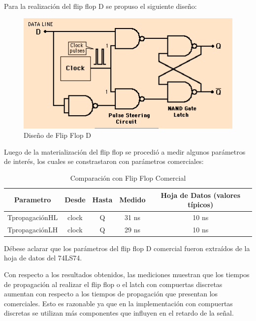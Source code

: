 Para la realización del flip flop D se propuso el siguiente diseño:

\begin{figure}[H]
\centering
\includegraphics[scale=0.5]{./circuitoFLIPFLOP.PNG}
\caption{Diseño de Flip Flop D}
\end{figure}

Luego de la materialización del flip flop se procedió a medir algunos
parámetros de interés, los cuales se constrastaron con parámetros
comerciales:

\begin{table}[H]
    \centering
\begin{tabular}{|c|c|c|c|c|}
\hline 
Parametro & Desde & Hasta & Medido & Hoja de Datos (valores típicos)\tabularnewline
\hline 
\hline 
TpropagaciónHL & clock & Q & 31 ns & 10 ns\tabularnewline
\hline 
TpropagaciónLH & clock & Q & 29 ns & 10 ns\tabularnewline
\hline 
\end{tabular}

\caption{Comparación con Flip Flop Comercial}
\end{table}

Débese aclarar que los parámetros del flip flop D comercial fueron
extraídos de la hoja de datos del 74LS74.

Con respecto a los resultados obtenidos, las mediciones muestran que
los tiempos de propagación al realizar el flip flop o el latch con
compuertas discretas aumentan con respecto a los tiempos de propagación
que presentan los comerciales. Esto es razonable ya que en la implementación
con compuertas discretas se utilizan más componentes que influyen
en el retardo de la señal.